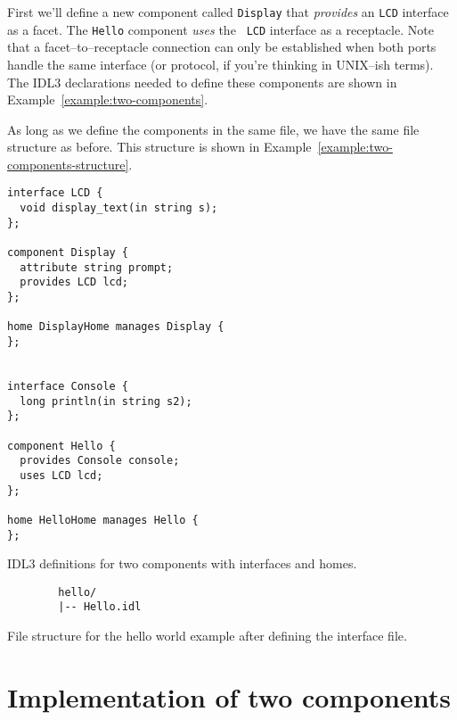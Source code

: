 First we'll define a new component called {\tt Display} that {\it provides} an
{\tt LCD} interface as a facet. The {\tt Hello} component {\it uses} the {\tt
LCD} interface as a receptacle. Note that a facet--to--receptacle connection can
only be established when both ports handle the same interface (or protocol, if
you're thinking in UNIX--ish terms). The IDL3 declarations needed to define
these components are shown in Example~\ref{example:two-components}.

As long as we define the components in the same file, we have the same file
structure as before. This structure is shown in
Example~\ref{example:two-components-structure}.

\begin{Example}
\begin{minifbox}
\begin{small}
\begin{verbatim}
interface LCD {
  void display_text(in string s);
};

component Display {
  attribute string prompt;
  provides LCD lcd;
};

home DisplayHome manages Display {
};


interface Console {
  long println(in string s2);
};

component Hello {
  provides Console console;
  uses LCD lcd;
};

home HelloHome manages Hello {
};
\end{verbatim}
\end{small}
\end{minifbox}
\caption{IDL3 definitions for two components with interfaces and homes.}
\label{example:two-components}
\end{Example}

\begin{Example}
\begin{minifbox}
\begin{small}
\begin{verbatim}
        hello/
        |-- Hello.idl
\end{verbatim}
\end{small}
\end{minifbox}
\caption{File structure for the hello world example after defining the interface
file.}
\label{example:two-components-structure}
\end{Example}

\section{Implementation of two components}

